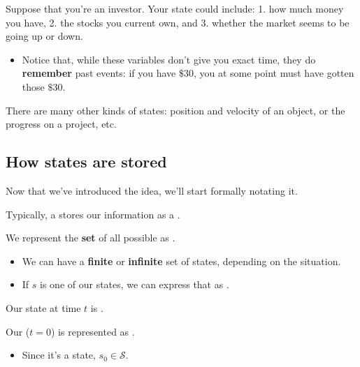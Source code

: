         \miniex Suppose that you're an investor. Your state could include: 1. how much money you have, 2. the stocks you current own, and 3. whether the market seems to be going up or down.

        \begin{itemize}
            \item Notice that, while these variables don't give you exact time, they do \textbf{remember} past events: if you have $\$30$, you at some point must have gotten those $\$30$.
        \end{itemize}
        
        There are many other kinds of states: position and velocity of an object, or the progress on a project, etc.




    \phantom{}

    \subsection{How states are stored}

        Now that we've introduced the idea, we'll start formally notating it.\\

        \begin{notation}
            Typically, a   stores our information as a .
            
            We represent the \textbf{set} of all possible  as . 
            
            \begin{itemize}
                \item We can have a \textbf{finite} or \textbf{infinite} set of states, depending on the situation.
                \item If $s$ is one of our states, we can express that as .
            \end{itemize}

            \subsecdiv
            
            Our state at time $t$ is .
            
            Our  ($t=0$) is represented as .         
            \begin{itemize}
                \item Since it's a state, $s_0 \in \mathcal{S}$.
            \end{itemize}
        \end{notation}

